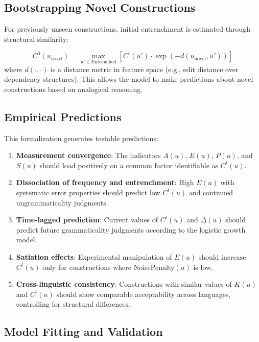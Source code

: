 \documentclass[12pt,letterpaper]{article}
\begin{document}
\subsection{Bootstrapping Novel Constructions}

For previously unseen constructions, initial entrenchment is estimated through structural similarity:

\[
C^0(u_{\text{novel}}) = \max_{u' \in \text{Entrenched}} \left[ C^t(u') \cdot \exp(-d(u_{\text{novel}}, u')) \right]
\]
where $d(\cdot, \cdot)$ is a distance metric in feature space (e.g., edit distance over dependency structures). This allows the model to make predictions about novel constructions based on analogical reasoning.

\subsection{Empirical Predictions}

This formalization generates testable predictions:

\begin{enumerate}
    \item \textbf{Measurement convergence}: The indicators $A(u)$, $E(u)$, $P(u)$, and $S(u)$ should load positively on a common factor identifiable as $C^t(u)$.
    
    \item \textbf{Dissociation of frequency and entrenchment}: High $E(u)$ with systematic error properties should predict low $C^t(u)$ and continued ungrammaticality judgments.
    
    \item \textbf{Time-lagged prediction}: Current values of $C^t(u)$ and $\Delta(u)$ should predict future grammaticality judgments according to the logistic growth model.
    
    \item \textbf{Satiation effects}: Experimental manipulation of $E(u)$ should increase $C^t(u)$ only for constructions where NoisePenalty$(u)$ is low.
    
    \item \textbf{Cross-linguistic consistency}: Constructions with similar values of $K(u)$ and $C^t(u)$ should show comparable acceptability across languages, controlling for structural differences.
\end{enumerate}

\subsection{Model Fitting and Validation}
\end{document}

